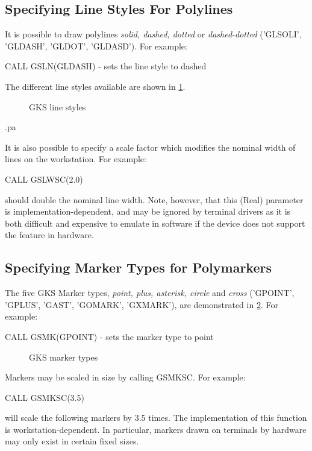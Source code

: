 \subsection{Specifying Line Styles For Polylines}
 
It is possible to draw polylines {\it solid, dashed, dotted}
or {\it dashed-dotted} ('GLSOLI', 'GLDASH', 'GLDOT', 'GLDASD').
For example:
\begin{XMP}
CALL GSLN(GLDASH) - sets the line style to dashed
\end{XMP}
The different line styles available are shown in \ref{fig:linstyl}.
\begin{figure}[h]
\caption{GKS line styles}
\label{fig:linstyl}
\end{figure}
.pa
 
It is also possible to specify a scale factor which modifies the nominal
width of lines on the workstation. For example:
\begin{XMP}
CALL GSLWSC(2.0)
\end{XMP}
should double the nominal line width. Note, however, that this (Real) parameter
is implementation-dependent, and may be ignored by terminal drivers as it
is both difficult and expensive to emulate in software if the device
does not support the feature in hardware.
\subsection{Specifying Marker Types for Polymarkers}
 
The five GKS Marker types, {\it point, plus, asterisk, circle}
and {\it cross} ('GPOINT', 'GPLUS', 'GAST', 'GOMARK', 'GXMARK'),
are demonstrated in \ref{fig:mark}.
For example:
\begin{XMP}
CALL GSMK(GPOINT) - sets the marker type to point
\end{XMP}
\begin{figure}[h]
\caption{GKS marker types}
\label{fig:mark}
\end{figure}
 
Markers may be scaled in size by calling GSMKSC. For example:
\begin{XMP}
CALL GSMKSC(3.5)
\end{XMP}
will scale the following markers by 3.5 times. The implementation of this
function is workstation-dependent. In particular, markers drawn on terminals
by hardware may only exist in certain fixed sizes.

